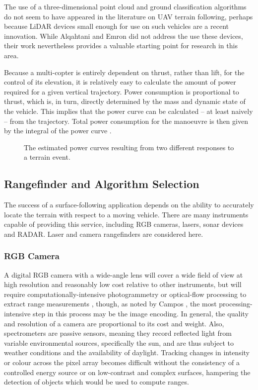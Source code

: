 \documentclass[10pt]{article}
\begin{document}
The use of a three-dimensional point cloud and ground classification algorithms do not seem to have appeared in the literature on UAV terrain following, perhaps because LiDAR devices small enough for use on such vehicles are a recent innovation. While Alqahtani and Emron \cite{Alqahtani2018} did not address the use these devices, their work nevertheless provides a valuable starting point for research in this area. 

Because a multi-copter is entirely dependent on thrust, rather than lift, for the control of its elevation, it is relatively easy to calculate the amount of power required for a given vertical trajectory. Power consumption is proportional to thrust, which is, in turn, directly determined by the mass and dynamic state of the vehicle. This implies that the power curve can be calculated -- at least naively -- from the trajectory. Total power consumption for the manoeuvre is then given by the integral of the power curve \cite{Halliday_Resnick_1988}.

\begin{figure}
\centering
\def\svgscale{0.8}

\caption{The estimated power curves resulting from two different responses to a terrain event.}
\label{fig:uav_power_curve}
\end{figure}


\subsection{Rangefinder and Algorithm Selection}

The success of a surface-following application depends on the ability to accurately locate the terrain with respect to a moving vehicle. There are many instruments capable of providing this service, including RGB cameras, lasers, sonar devices and RADAR. Laser and camera rangefinders are considered here.

\subsubsection{RGB Camera}

A digital RGB camera with a wide-angle lens will cover a wide field of view at high resolution and reasonably low cost relative to other instruments, but will require computationally-intensive photogrammetry or optical-flow processing to extract range measurements \cite{Campos2016,Herisse2010,Netter2002,Hammoud2011}, though, as noted by Campos \cite{Campos2016}, the most processing-intensive step in this process may be the image encoding. In general, the quality and resolution of a camera are proportional to its cost and weight. Also, spectrometers are passive sensors, meaning they record reflected light from variable environmental sources, specifically the sun, and are thus subject to weather conditions and the availability of daylight. Tracking changes in intensity or colour across the pixel array becomes difficult without the consistency of a controlled energy source or on low-contrast and complex surfaces, hampering the detection of objects which would be used to compute ranges. 
\end{document}
